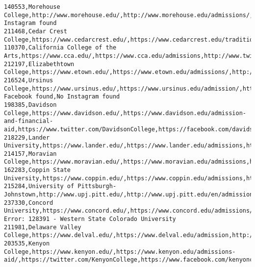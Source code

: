 \documentclass[11pt]{article}
\begin{document}
\begin{Verbatim}[commandchars=\\\{\}]
140553,Morehouse College,http://www.morehouse.edu/,http://www.morehouse.edu/admissions/,https://twitter.com/Morehouse,https://www.facebook.com/Morehouse1867/,No Instagram found
211468,Cedar Crest College,https://www.cedarcrest.edu/,https://www.cedarcrest.edu/traditional/index.shtm,https://www.twitter.com/cedarcrestcolle,https://www.facebook.com/127294303966359/posts/2335661199796314,https://www.instagram.com/evergreensoccerclub
110370,California College of the Arts,https://www.cca.edu/,https://www.cca.edu/admissions,http://www.twitter.com/CACollegeofArts,http://www.facebook.com/CaliforniaCollegeoftheArts,http://instagram.com/cacollegeofarts
212197,Elizabethtown College,https://www.etown.edu/,https://www.etown.edu/admissions/,http://twitter.com/etowncollege,http://www.facebook.com/etowncollege,http://instagram.com/etowncollege
216524,Ursinus College,https://www.ursinus.edu/,https://www.ursinus.edu/admission/,http://twitter.com/UrsinusAdmit,No Facebook found,No Instagram found
198385,Davidson College,https://www.davidson.edu/,https://www.davidson.edu/admission-and-financial-aid,https://www.twitter.com/DavidsonCollege,https://facebook.com/davidsoncollege.nc,https://instagram.com/davidsoncollege
218229,Lander University,https://www.lander.edu/,https://www.lander.edu/admissions,http://twitter.com/follow\_lander,http://www.facebook.com/followlander,https://instagram.com/landeruniversity/
214157,Moravian College,https://www.moravian.edu/,https://www.moravian.edu/admissions,https://twitter.com/MoravianCollege,https://www.facebook.com/99087857199\_10156735740487200,https://www.instagram.com/p/BoWvda5jiC3/
162283,Coppin State University,https://www.coppin.edu/,https://www.coppin.edu/admissions,http://twitter.com/coppinstateuniv,https://www.facebook.com/coppinstateuniversity/videos/526987977763884/,https://www.instagram.com/coppinstateuniversity/
215284,University of Pittsburgh-Johnstown,http://www.upj.pitt.edu/,http://www.upj.pitt.edu/en/admissions/admissions/,http://twitter.com/PittJohnstown,https://www.facebook.com/PittJohnstown,http://instagram.com/pitt\_johnstown
237330,Concord University,https://www.concord.edu/,https://www.concord.edu/admissions/node/1,https://twitter.com/CampusBeautiful,https://www.facebook.com/concorduniversity,https://www.instagram.com/concorduniversity/
Error: 128391 - Western State Colorado University
211981,Delaware Valley College,https://www.delval.edu/,https://www.delval.edu/admission,http://twitter.com/DelVal,http://www.facebook.com/delval,http://www.instagram.com/delawarevalleyuniversity
203535,Kenyon College,https://www.kenyon.edu/,https://www.kenyon.edu/admissions-aid/,https://twitter.com/KenyonCollege,https://www.facebook.com/kenyoncollege,https://www.instagram.com/p/Bo9ooXGHmhn/

\end{Verbatim}
\end{document}
